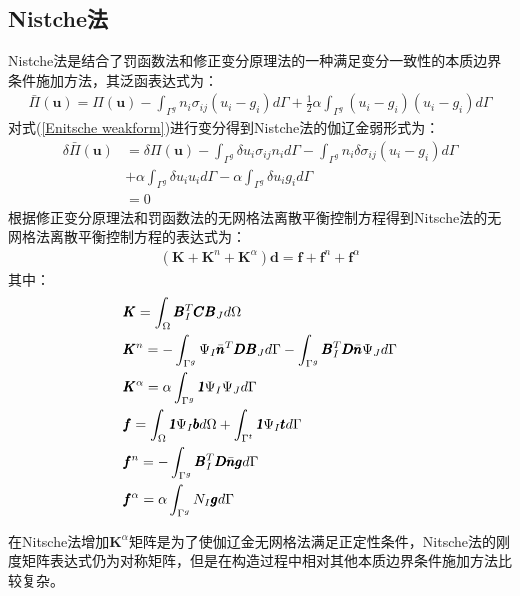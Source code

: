 \subsection{Nistche法}
Nistche法是结合了罚函数法和修正变分原理法的一种满足变分一致性的本质边界条件施加方法，其泛函表达式为：
\begin{equation}\label{Enitsche weakform}
\begin{split}
    \bar{\Pi}(\pmb{u})=\Pi(\pmb{u})-\int_{\Gamma^g}n_i\sigma_{ij}(u_i-g_i)d\Gamma+\frac{1}{2}\alpha\int_{\Gamma^g}(u_i-g_i)(u_i-g_i)d\Gamma
\end{split}
\end{equation}
对式(\ref{Enitsche weakform})进行变分得到Nistche法的伽辽金弱形式为：
\begin{equation}
\begin{split}
    \delta\bar{\Pi}(\pmb{u})&=\delta\Pi(\pmb{u})-\int_{\Gamma^g}\delta u_i\sigma_{ij}n_id\Gamma-\int_{\Gamma^g}n_i\delta\sigma_{ij}(u_i-g_i)d\Gamma\\
&+\alpha\int_{\Gamma^g}\delta u_iu_id\Gamma-\alpha\int_{\Gamma^g}\delta u_i g_id\Gamma\\
&=0
\end{split}
\end{equation}
根据修正变分原理法和罚函数法的无网格法离散平衡控制方程得到Nitsche法的无网格法离散平衡控制方程的表达式为：
\begin{equation}
\begin{split}
    (\pmb{K}+\pmb{K}^n+\pmb{K}^{\alpha})\pmb{d}=\pmb{f}+\pmb{f}^n+\pmb{f}^{\alpha}
\end{split}
\end{equation}
其中：
\begin{equation}
\begin{split}
    &\pmb{K}=\int_{\Omega}\pmb{B}_I^T\pmb{C}\pmb{B}_Jd\Omega\\
    &\pmb{K}^n=-\int_{\Gamma^g}\Psi_I\bar{\pmb{n}}^T\pmb{D}\pmb{B}_Jd\Gamma-\int_{\Gamma^g}\pmb{B}_I^T\pmb{D}\bar{\pmb{n}}\Psi_Jd\Gamma\\
    &\pmb{K}^{\alpha}=\alpha\int_{\Gamma^g}\pmb{\textsl{1}}\Psi_I\Psi_Jd\Gamma\\
    &\pmb{f}=\int_{\Omega}\pmb{\textsl{1}}\Psi_I\pmb{b}d\Omega+\int_{\Gamma^t}\pmb{\textsl{1}}\Psi_I\pmb{t}d\Gamma\\
    &\pmb{f}^n=-\int_{\Gamma^g}\pmb{B}_I^T\pmb{D}\bar{\pmb{n}}\pmb{g}d\Gamma\\
    &\pmb{f}^{\alpha}=\alpha\int_{\Gamma^g}N_I\pmb{g}d\Gamma
\end{split}
\end{equation}\par
在Nitsche法增加$\pmb{K}^{\alpha}$矩阵是为了使伽辽金无网格法满足正定性条件，Nitsche法的刚度矩阵表达式仍为对称矩阵，但是在构造过程中相对其他本质边界条件施加方法比较复杂。
